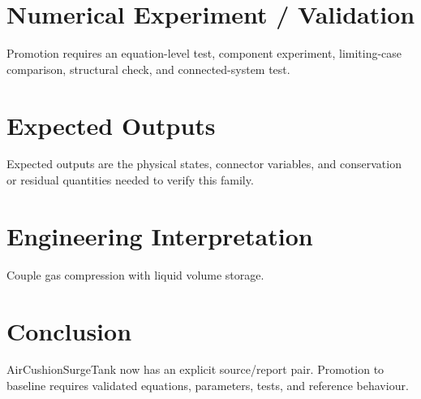 \documentclass[10pt,a4paper]{article}
\begin{document}
\section{Numerical Experiment / Validation}Promotion requires an equation-level test, component experiment, limiting-case comparison, structural check, and connected-system test.
\section{Expected Outputs}Expected outputs are the physical states, connector variables, and conservation or residual quantities needed to verify this family.
\section{Engineering Interpretation}Couple gas compression with liquid volume storage.
\section*{Conclusion}AirCushionSurgeTank now has an explicit source/report pair. Promotion to baseline requires validated equations, parameters, tests, and reference behaviour.
\end{document}
